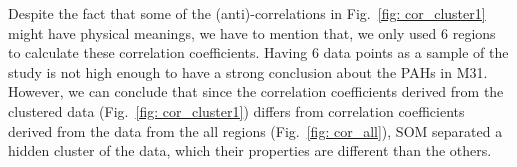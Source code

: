        Despite the fact that some of the (anti)-correlations in Fig.~\ref{fig: cor_cluster1} might have physical meanings, we have to mention that, we only used 6 regions to calculate these correlation coefficients.
       Having 6 data points as a sample of the study is not high enough to have a strong conclusion about the PAHs in M31.%
        However, we can conclude that since the correlation coefficients derived from the clustered data (Fig.~\ref{fig: cor_cluster1}) differs from correlation coefficients derived from the data from the all regions (Fig.~\ref{fig: cor_all}), SOM separated a hidden cluster of the data, which their properties are different than the others. %
        
        
        
        
        
